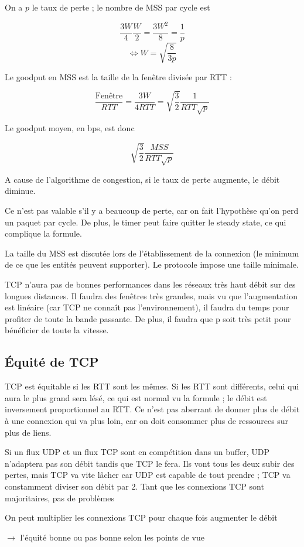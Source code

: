 	

On a $p$ le taux de perte ; le nombre de MSS par cycle est

$$ \frac{3W}{4} \frac{W}{2} = \frac{3W^2}{8} = \frac{1}{p}$$
$$\Leftrightarrow W = \sqrt{\frac{8}{3p}}$$


Le goodput en MSS est la taille de la fenêtre divisée par RTT :

$$\frac{\text{Fenêtre}}{RTT} = \frac{3W}{4RTT} =  \sqrt{\frac{3}{2}} \frac{1}{RTT \sqrt{p}}$$

Le goodput moyen, en bps, est donc

$$\sqrt{\frac{3}{2}} \frac{MSS}{RTT \sqrt{p}}$$

A cause de l'algorithme de congestion, si le taux de perte augmente, le débit diminue.
	
Ce n'est pas valable s'il y a beaucoup de perte, car on fait l'hypothèse qu'on perd un paquet par cycle. De plus, le timer peut faire quitter le steady state, ce qui complique la formule.

La taille du MSS est discutée lors de l'établissement de la connexion (le minimum de ce que les entités peuvent supporter). Le protocole impose une taille minimale.

TCP n'aura pas de bonnes performances dans les réseaux très haut débit sur des longues distances. Il faudra des fenêtres très grandes, mais vu que l'augmentation est linéaire (car TCP ne connaît pas l'environnement), il faudra du temps pour profiter de toute la bande passante. De plus, il faudra que p soit très petit pour bénéficier de toute la vitesse.



\subsection{Équité de TCP} 		 		

TCP est équitable si les RTT sont les mêmes.		 						 		 		
Si les RTT sont différents, celui qui aura le plus grand sera lésé, ce qui est normal vu la formule ; le débit est inversement proportionnel au RTT. 	
Ce n'est pas aberrant de donner plus de débit à une connexion qui va plus loin, car on doit consommer plus de ressources sur plus de liens.
	
	Si un flux UDP et un flux TCP sont en compétition dans un buffer, UDP n'adaptera pas son débit tandis que TCP le fera. Ils vont tous les deux subir des pertes, mais TCP va vite lâcher car UDP est capable de tout prendre ; TCP va constamment diviser son débit par 2. Tant que les connexions TCP sont majoritaires, pas de problèmes
	
	On peut multiplier les connexions TCP pour chaque fois augmenter le débit
	
	$\longrightarrow$ l'équité bonne ou pas bonne selon les points de vue 		 	 
	
	